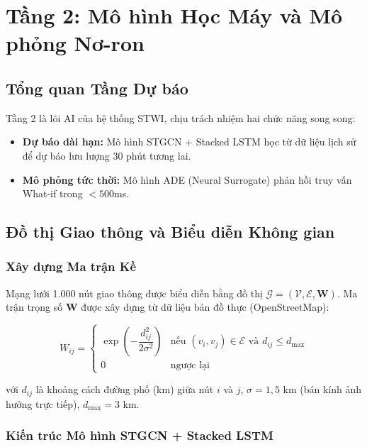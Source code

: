 \chapter{Tầng 2: Mô hình Học Máy và Mô phỏng Nơ-ron}

\section{Tổng quan Tầng Dự báo}

Tầng 2 là lõi AI của hệ thống STWI, chịu trách nhiệm hai chức năng song song:
\begin{itemize}[itemsep=3pt]
  \item \textbf{Dự báo dài hạn:} Mô hình STGCN + Stacked LSTM học từ dữ liệu lịch sử để dự báo lưu lượng 30 phút tương lai.
  \item \textbf{Mô phỏng tức thời:} Mô hình ADE (Neural Surrogate) phản hồi truy vấn What-if trong $< 500$ms.
\end{itemize}

\section{Đồ thị Giao thông và Biểu diễn Không gian}

\subsection{Xây dựng Ma trận Kề}

Mạng lưới 1.000 nút giao thông được biểu diễn bằng đồ thị $\mathcal{G} = (\mathcal{V}, \mathcal{E}, \mathbf{W})$. Ma trận trọng số $\mathbf{W}$ được xây dựng từ dữ liệu bản đồ thực (OpenStreetMap):

\begin{equation}
  W_{ij} = \begin{cases}
    \exp\!\left(-\dfrac{d_{ij}^2}{2\sigma^2}\right) & \text{nếu } (v_i, v_j) \in \mathcal{E} \text{ và } d_{ij} \leq d_{\max} \\
    0 & \text{ngược lại}
  \end{cases}
  \label{eq:weight_matrix}
\end{equation}

với $d_{ij}$ là khoảng cách đường phố (km) giữa nút $i$ và $j$, $\sigma = 1{,}5$ km (bán kính ảnh hưởng trực tiếp), $d_{\max} = 3$ km.

\subsection{Kiến trúc Mô hình STGCN + Stacked LSTM}

